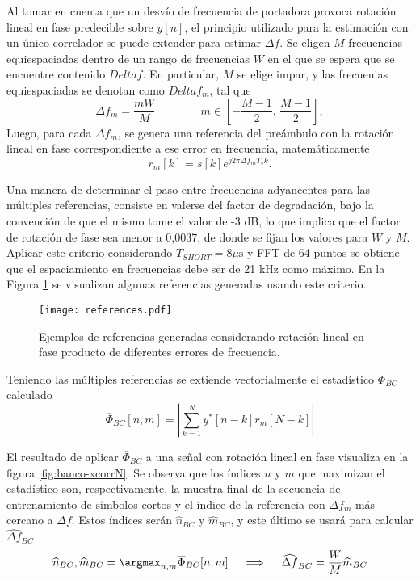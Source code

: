 Al tomar en cuenta que un desvío de frecuencia de portadora provoca rotación lineal en fase predecible sobre $y[n]$, el principio utilizado para la estimación con un único correlador se puede extender para estimar $\Delta f$. Se eligen $M$ frecuencias equiespaciadas dentro de un rango de frecuencias $W$ en el que se espera que se encuentre contenido $Delta f$. En particular, $M$ se elige impar, y las frecuenias equiespaciadas se denotan como $Delta f_m$, tal que
\begin{equation}
    \Delta f_m = \frac{mW}{M} \qquad\qquad m \in \left[-\frac{M-1}{2},\,\frac{M-1}{2}\right],
\end{equation}
Luego, para cada $\Delta f_m$, se genera una referencia del preámbulo con la rotación lineal en fase correspondiente a ese error en frecuencia, matemáticamente
\begin{equation}
    r_m[k] = s[k] e^{j2\pi \Delta f_m T_s k}.
\end{equation}

Una manera de determinar el paso entre frecuencias adyancentes para las múltiples referencias, consiste en valerse del factor de degradación, bajo la convención de que el mismo tome el valor de -3 dB, lo que implica que el factor de rotación de fase sea menor a 0,0037, de donde se fijan los valores para $W$ y $M$. Aplicar este criterio considerando $T_{SHORT} = 8 \mu\text{s}$ y FFT de 64 puntos se obtiene que el espaciamiento en frecuencias debe ser de 21 kHz como máximo. En la Figura \ref{fig:references} se visualizan algunas referencias generadas usando este criterio.
\begin{figure}[t]
    \centering{}\texttt{[image: references.pdf]}
    \caption{Ejemplos de referencias generadas considerando rotación lineal en fase producto de diferentes errores de frecuencia.\label{fig:references}}  
\end{figure}


Teniendo las múltiples referencias se extiende vectorialmente el estadístico $\Phi_{BC}$ calculado
\begin{equation}\label{eq:correladores-banco}
    \overline{\Phi}_{BC}[n,m] = \left\lvert \sum_{k=1}^{N}y^\ast[n-k]r_m[N-k] \right\rvert
\end{equation}

El resultado de aplicar $\overline{\Phi}_{BC}$ a una señal con rotación lineal en fase visualiza en la figura \ref{fig:banco-xcorrN}. Se observa que los índices $n$ y $m$ que maximizan el estadístico son, respectivamente, la muestra final de la secuencia de entrenamiento de símbolos cortos y el índice de la referencia con $\Delta f_m$ más cercano a $\Delta f$. Estos índices serán $\widehat{n}_{BC}$ y $\widehat{m}_{BC}$, y este último se usará para calcular $\widehat{\Delta f}_{BC}$
\begin{equation}
    \widehat{n}_{BC}, \widehat{m}_{BC} = \argmax_{n,m}\overline{\Phi}_{BC}[n,m] \quad \implies \quad     \widehat{\Delta f}_{BC} = \frac{W}{M} \widehat{m}_{BC}
\end{equation}

